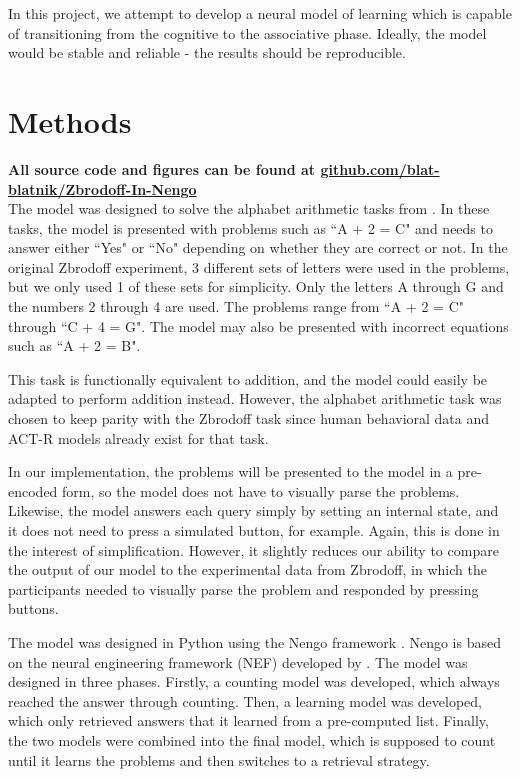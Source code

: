 \documentclass[10pt, a4paper, twocolumn]{article}
\begin{document}
In this project, we attempt to develop a neural model of learning which is capable of transitioning from the cognitive to the associative phase. Ideally, the model would be stable and reliable - the results should be reproducible.
	
\section{Methods}

\textbf{All source code and figures can be found at \href{https://github.com/blat-blatnik/Zbrodoff-In-Nengo}{github.com/blat-blatnik/Zbrodoff-In-Nengo}}\\
	
The model was designed to solve the alphabet arithmetic tasks from \cite{Zbrodoff1995}. In these tasks, the model is presented with problems such as ``A + 2 = C" and needs to answer either ``Yes" or ``No" depending on whether they are correct or not. In the original Zbrodoff experiment, 3 different sets of letters were used in the problems, but we only used 1 of these sets for simplicity. Only the letters A through G and the numbers 2 through 4 are used. The problems range from ``A + 2 = C" through ``C + 4 = G". The model may also be presented with incorrect equations such as ``A + 2 = B".

This task is functionally equivalent to addition, and the model could easily be adapted to perform addition instead. However, the alphabet arithmetic task was chosen to keep parity with the Zbrodoff task since human behavioral data and ACT-R models already exist for that task.

In our implementation, the problems will be presented to the model in a pre-encoded form, so the model does not have to visually parse the problems. Likewise, the model answers each query simply by setting an internal state, and it does not need to press a simulated button, for example. Again, this is done in the interest of simplification. However, it slightly reduces our ability to compare the output of our model to the experimental data from Zbrodoff, in which the participants needed to visually parse the problem and responded by pressing buttons.

The model was designed in Python using the Nengo framework \citep{Nengo}. Nengo is based on the neural engineering framework (NEF) developed by \cite{Eliasmith2003}. The model was designed in three phases. Firstly, a counting model was developed, which always reached the answer through counting. Then, a learning model was developed, which only retrieved answers that it learned from a pre-computed list. Finally, the two models were combined into the final model, which is supposed to count until it learns the problems and then switches to a retrieval strategy.
\end{document}
